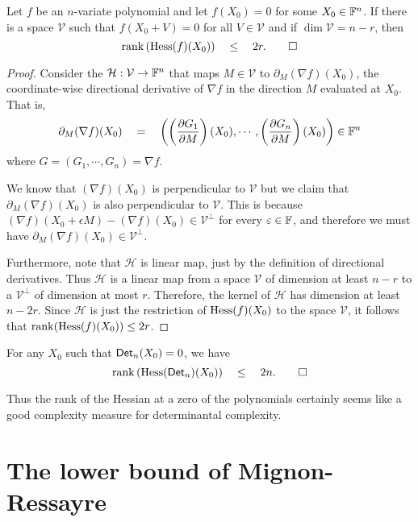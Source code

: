 \begin{lemma}\label{lem:hess-large-perturbations}
Let $f$ be an $n$-variate polynomial and let $f(X_0) = 0$ for some $X_0 \in \mathbb{F}^n$. If there is a space $\mathcal{V}$ such that $f(X_0 + V) = 0$ for all $V \in \mathcal{V}$ and if $\dim \mathcal{V} = n - r$, then
\[
\operatorname{rank}\left(\operatorname{Hess}(f)(X_0)\right) \quad \leq \quad 2r. \qedhere
\]
\end{lemma}
\begin{proof}
Consider the $\mathcal{H}:\mathcal{V} \rightarrow \mathbb{F}^n$ that maps $M \in \mathcal{V}$ to $\partial_M(\nabla f) (X_0)$, the coordinate-wise directional derivative of $\nabla f$ in the direction $M$ evaluated at $X_0$. That is, 
\[
\partial_M(\nabla f) (X_0) \quad = \quad \left(\left(\frac{\partial G_1}{\partial M}\right) (X_0) , \cdots, \left(\frac{\partial G_n}{\partial M}\right) (X_0)\right) \in \mathbb{F}^n
\]
where $G = (G_1, \cdots, G_n) = \nabla f$. 

We know that $(\nabla f)(X_0)$ is perpendicular to $\mathcal{V}$ but we claim that $\partial_M(\nabla f) (X_0)$ is also perpendicular to $\mathcal{V}$. This is because $(\nabla f)( X_0 + \epsilon M) - (\nabla f)(X_0) \in \mathcal{V}^\perp$ for every $\varepsilon \in \mathbb{F}$, and therefore we must have $\partial_M(\nabla f)(X_0) \in \mathcal{V}^{\perp}$. 

Furthermore, note that $\mathcal{H}$ is linear map, just by the definition of directional derivatives. Thus $\mathcal{H}$ is a linear map from a space $\mathcal{V}$ of dimension at least $n-r$ to a $\mathcal{V}^\perp$ of dimension at most $r$. Therefore, the kernel of $\mathcal{H}$ has dimension at least $n - 2r$. Since $\mathcal{H}$ is just the restriction of $\operatorname{Hess}(f)(X_0)$ to the space $\mathcal{V}$, it follows that $\operatorname{rank}(\operatorname{Hess}(f)(X_0)) \leq 2r$. 
\end{proof}



\begin{corollarywp}\label{cor:hess-det}
For any $X_0$ such that $\operatorname{\mathsf{Det}}_n(X_0) = 0$, we have
\[
\operatorname{rank}\left(\operatorname{Hess}(\operatorname{\mathsf{Det}}_n)(X_0)\right) \quad \leq \quad 2n. \qedhere
\]
\end{corollarywp}

Thus the rank of the Hessian at a zero of the polynomials certainly seems like a good complexity measure for determinantal complexity. 

\section{The lower bound of Mignon-Ressayre}

